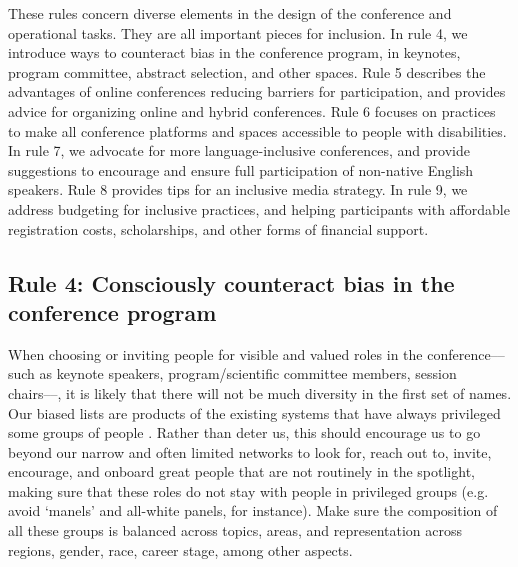 \documentclass[10pt,letterpaper]{article}
\begin{document}
These rules concern diverse elements in the design of the conference and operational tasks. They are all important pieces for inclusion.
In rule 4, we introduce ways to counteract bias in the conference program, in keynotes, program committee, abstract selection, and other spaces. 
Rule 5 describes the advantages of online conferences reducing barriers for participation, and provides advice for organizing online and hybrid conferences.
Rule 6 focuses on practices to make all conference platforms and spaces accessible to people with disabilities. 
In rule 7, we advocate for more language-inclusive conferences, and provide suggestions to encourage and ensure full participation of non-native English speakers. 
Rule 8 provides tips for an inclusive media strategy. 
In rule 9, we address budgeting for inclusive practices, and helping participants with affordable registration costs, scholarships, and other forms of financial support.


\subsection*{Rule 4: Consciously counteract bias in the conference program}
\label{rule_unbias}

When choosing or inviting people for visible and valued roles in the conference––such as keynote speakers, program/scientific committee members, session chairs––, it is likely that there will not be much diversity in the first set of names.
Our biased lists are products of the existing systems that have always privileged some groups of people \cite{dwyerNoticeWhoScience2021,swartzScienceValueDiversity2019,wongBuildDiversityScience2020,dignazioUnicornsJanitorsNinjas2020}. 
Rather than deter us, this should encourage us to go beyond our narrow and often limited networks to look for, reach out to, invite, encourage, and onboard great people that are not routinely in the spotlight, making sure that these roles do not stay with people in privileged groups (e.g. avoid `manels' and all-white panels, for instance).
Make sure the composition of all these groups is balanced across topics, areas, and representation across regions, gender, race, career stage, among other aspects.
\end{document}
